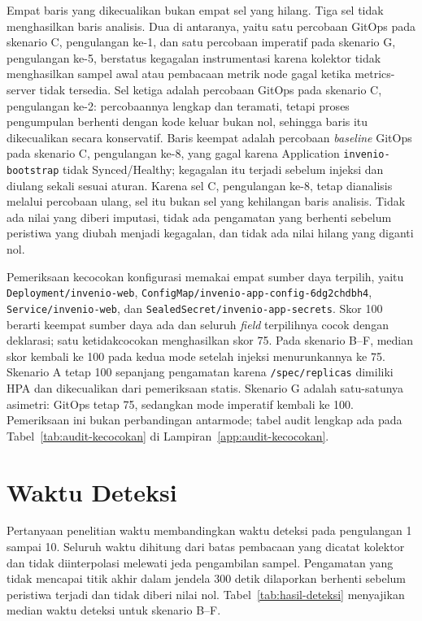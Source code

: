 Empat baris yang dikecualikan bukan empat sel yang hilang. Tiga sel tidak menghasilkan baris analisis. Dua di antaranya, yaitu satu percobaan GitOps pada skenario C, pengulangan ke-1, dan satu percobaan imperatif pada skenario G, pengulangan ke-5, berstatus kegagalan instrumentasi karena kolektor tidak menghasilkan sampel awal atau pembacaan metrik node gagal ketika metrics-server tidak tersedia. Sel ketiga adalah percobaan GitOps pada skenario C, pengulangan ke-2: percobaannya lengkap dan teramati, tetapi proses pengumpulan berhenti dengan kode keluar bukan nol, sehingga baris itu dikecualikan secara konservatif. Baris keempat adalah percobaan \textit{baseline} GitOps pada skenario C, pengulangan ke-8, yang gagal karena Application \texttt{invenio-bootstrap} tidak Synced/Healthy; kegagalan itu terjadi sebelum injeksi dan diulang sekali sesuai aturan. Karena sel C, pengulangan ke-8, tetap dianalisis melalui percobaan ulang, sel itu bukan sel yang kehilangan baris analisis. Tidak ada nilai yang diberi imputasi, tidak ada pengamatan yang berhenti sebelum peristiwa yang diubah menjadi kegagalan, dan tidak ada nilai hilang yang diganti nol.

Pemeriksaan kecocokan konfigurasi memakai empat sumber daya terpilih, yaitu \texttt{Deployment/invenio-web}, \texttt{ConfigMap/invenio-app-config-6dg2chdbh4}, \texttt{Service/invenio-web}, dan \texttt{SealedSecret/invenio-app-secrets}. Skor 100 berarti keempat sumber daya ada dan seluruh \textit{field} terpilihnya cocok dengan deklarasi; satu ketidakcocokan menghasilkan skor 75. Pada skenario B--F, median skor kembali ke 100 pada kedua mode setelah injeksi menurunkannya ke 75. Skenario A tetap 100 sepanjang pengamatan karena \texttt{/spec/replicas} dimiliki HPA dan dikecualikan dari pemeriksaan statis. Skenario G adalah satu-satunya asimetri: GitOps tetap 75, sedangkan mode imperatif kembali ke 100. Pemeriksaan ini bukan perbandingan antarmode; tabel audit lengkap ada pada Tabel~\ref{tab:audit-kecocokan} di Lampiran~\ref{app:audit-kecocokan}.



\section{Waktu Deteksi}
\label{sec:waktu-deteksi}

Pertanyaan penelitian waktu membandingkan waktu deteksi pada pengulangan 1 sampai 10. Seluruh waktu dihitung dari batas pembacaan yang dicatat kolektor dan tidak diinterpolasi melewati jeda pengambilan sampel. Pengamatan yang tidak mencapai titik akhir dalam jendela 300 detik dilaporkan berhenti sebelum peristiwa terjadi dan tidak diberi nilai nol. Tabel~\ref{tab:hasil-deteksi} menyajikan median waktu deteksi untuk skenario B--F.

